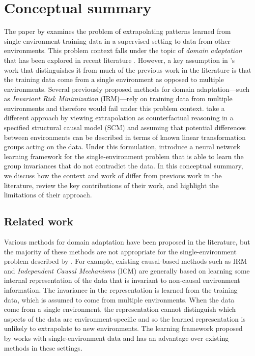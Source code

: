 

\section{Conceptual summary}

The paper by \textcite{Mouli:2021} examines the problem of extrapolating patterns learned from single-environment training data in a supervised setting to data from other environments. This problem context falls under the topic of \textit{domain adaptation} that has been explored in recent literature \parencite{Farahani:2020}. However, a key assumption in \citeauthor{Mouli:2021}'s work that distinguishes it from much of the previous work in the literature is that the training data come from a single environment as opposed to multiple environments. Several previously proposed methods for domain adaptation---such as \textit{Invariant Risk Minimization} \parencite{Arjovsky:2020} (IRM)---rely on training data from multiple environments and therefore would fail under this problem context. \citeauthor{Mouli:2021} take a different approach by viewing extrapolation as counterfactual reasoning in a specified structural causal model (SCM) and assuming that potential differences between environments can be described in terms of known linear transformation groups acting on the data. Under this formulation, \citeauthor{Mouli:2021} introduce a neural network learning framework for the single-environment problem that is able to learn the group invariances that do not contradict the data. In this conceptual summary, we discuss how the context and work of \textcite{Mouli:2021} differ from previous work in the literature, review the key contributions of their work, and highlight the limitations of their approach.


\subsection{Related work}

Various methods for domain adaptation have been proposed in the literature, but the majority of these methods are not appropriate for the single-environment problem described by \textcite{Mouli:2021}. For example, existing causal-based methods such as IRM and \textit{Independent Causal Mechanisms} \parencite{Parascandolo:2018} (ICM) are generally based on learning some internal representation of the data that is invariant to non-causal environment information. The invariance in the representation is learned from the training data, which is assumed to come from multiple environments. When the data come from a single environment, the representation cannot distinguish which aspects of the data are environment-specific and so the learned representation is unlikely to extrapolate to new environments. The learning framework proposed by \citeauthor{Mouli:2021} works with single-environment data and has an advantage over existing methods in these settings.
\\

